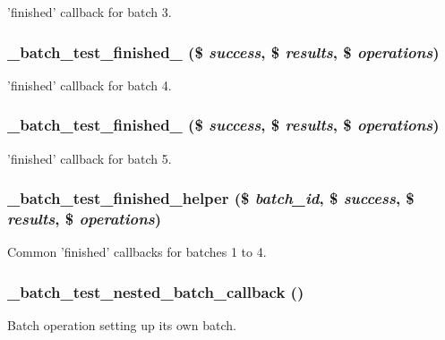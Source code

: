 \label{batch__test_8callbacks_8inc_ad4f60f4d44dfb1e22c8095a9b257be13}
'finished' callback for batch 3. \hypertarget{batch__test_8callbacks_8inc_aec528f5d3b93f250ef9ed51c450989e9}{
\subsubsection[{\_\-batch\_\-test\_\-finished\_\-4}]{\setlength{\rightskip}{0pt plus 5cm}\_\-batch\_\-test\_\-finished\_ (\$ {\em success}, \/  \$ {\em results}, \/  \$ {\em operations})}}
\label{batch__test_8callbacks_8inc_aec528f5d3b93f250ef9ed51c450989e9}
'finished' callback for batch 4. \hypertarget{batch__test_8callbacks_8inc_a5a8ba83637ae5e76d03690b558ed4c84}{
\subsubsection[{\_\-batch\_\-test\_\-finished\_\-5}]{\setlength{\rightskip}{0pt plus 5cm}\_\-batch\_\-test\_\-finished\_ (\$ {\em success}, \/  \$ {\em results}, \/  \$ {\em operations})}}
\label{batch__test_8callbacks_8inc_a5a8ba83637ae5e76d03690b558ed4c84}
'finished' callback for batch 5. \hypertarget{batch__test_8callbacks_8inc_a46f274aa08ec4ba2ebc49e444c075cf2}{
\subsubsection[{\_\-batch\_\-test\_\-finished\_\-helper}]{\setlength{\rightskip}{0pt plus 5cm}\_\-batch\_\-test\_\-finished\_\-helper (\$ {\em batch\_\-id}, \/  \$ {\em success}, \/  \$ {\em results}, \/  \$ {\em operations})}}
\label{batch__test_8callbacks_8inc_a46f274aa08ec4ba2ebc49e444c075cf2}
Common 'finished' callbacks for batches 1 to 4. \hypertarget{batch__test_8callbacks_8inc_ab459d5bba304e2cc2efc37b125b1d97a}{
\subsubsection[{\_\-batch\_\-test\_\-nested\_\-batch\_\-callback}]{\setlength{\rightskip}{0pt plus 5cm}\_\-batch\_\-test\_\-nested\_\-batch\_\-callback ()}}
\label{batch__test_8callbacks_8inc_ab459d5bba304e2cc2efc37b125b1d97a}
Batch operation setting up its own batch. 
